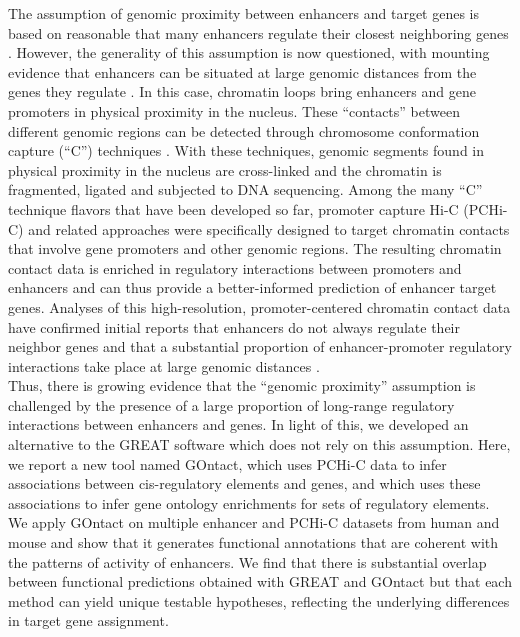 The assumption of genomic proximity between enhancers and target genes is based on reasonable that many enhancers regulate their closest neighboring genes \citep{gasperini_genome-wide_2019}. However, the generality of this assumption is now questioned, with mounting evidence that enhancers can be situated at large genomic distances from the genes they regulate \citep{montavon_regulatory_2011,de_laat_topology_2013,smemo_obesity-associated_2014}. In this case, chromatin loops bring enhancers and gene promoters in physical proximity in the nucleus. These “contacts” between different genomic regions can be detected through chromosome conformation capture (“C”) techniques \citep{lieberman-aiden_comprehensive_2009,de_wit_decade_2012,belton_hic_2012,dekker_exploring_2013}. With these techniques, genomic segments found in physical proximity in the nucleus are cross-linked and the chromatin is fragmented, ligated and subjected to DNA sequencing. Among the many “C” technique flavors that have been developed so far, promoter capture Hi-C (PCHi-C) and related approaches \citep{mifsud_mapping_2015,schoenfelder_pluripotent_2015,golov_modified_2020,downes_high-resolution_2021} were specifically designed to target chromatin contacts that involve gene promoters and other genomic regions. The resulting chromatin contact data is enriched in regulatory interactions between promoters and enhancers \citep{mifsud_mapping_2015,schoenfelder_pluripotent_2015,golov_modified_2020,downes_high-resolution_2021} and can thus provide a better-informed prediction of enhancer target genes. Analyses of this high-resolution, promoter-centered chromatin contact data have confirmed initial reports that enhancers do not always regulate their neighbor genes and that a substantial proportion of enhancer-promoter regulatory interactions take place at large genomic distances \citep{mifsud_mapping_2015,schoenfelder_pluripotent_2015,schoenfelder_long-range_2019,laverre_long-range_2022}. \\

Thus, there is growing evidence that the “genomic proximity” assumption is challenged by the presence of a large proportion of long-range regulatory interactions between enhancers and genes. In light of this, we developed an alternative to the GREAT software which does not rely on this assumption. Here, we report a new tool named GOntact, which uses PCHi-C data to infer associations between \gls{cis}-regulatory elements and genes, and which uses these associations to infer gene ontology enrichments for sets of regulatory elements. We apply GOntact on multiple enhancer and PCHi-C datasets from human and mouse and show that it generates functional annotations that are coherent with the patterns of activity of enhancers. We find that there is substantial overlap between functional predictions obtained with GREAT and GOntact but that each method can yield unique testable hypotheses, reflecting the underlying differences in target gene assignment. 

